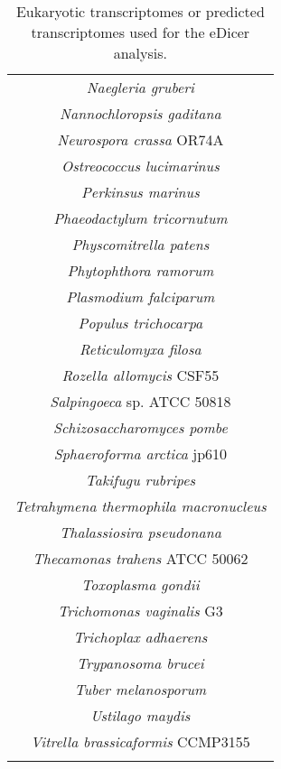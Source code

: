 \begin{center}
\begin{longtable}{|c|}
\textit{Naegleria gruberi}\\
\textit{Nannochloropsis gaditana}\\
\textit{Neurospora crassa} OR74A\\
\textit{Ostreococcus lucimarinus}\\
\textit{Perkinsus marinus}\\
\textit{Phaeodactylum tricornutum}\\
\textit{Physcomitrella patens}\\
\textit{Phytophthora ramorum}\\
\textit{Plasmodium falciparum}\\
\textit{Populus trichocarpa}\\
\textit{Reticulomyxa filosa}\\
\textit{Rozella allomycis} CSF55\\
\textit{Salpingoeca} sp. ATCC 50818\\
\textit{Schizosaccharomyces pombe}\\
\textit{Sphaeroforma arctica} jp610\\
\textit{Takifugu rubripes}\\
\textit{Tetrahymena thermophila macronucleus}\\
\textit{Thalassiosira pseudonana}\\
\textit{Thecamonas trahens} ATCC 50062\\
\textit{Toxoplasma gondii}\\
\textit{Trichomonas vaginalis} G3\\
\textit{Trichoplax adhaerens}\\
\textit{Trypanosoma brucei}\\
\textit{Tuber melanosporum}\\
\textit{Ustilago maydis}\\
\textit{Vitrella brassicaformis} CCMP3155\\
\hline
\caption[Eukaryotes Used for eDicer Anaylsis]{Eukaryotic transcriptomes 
or predicted transcriptomes used for the eDicer analysis.}
\label{tab:edicer_genomes_euks}

\end{longtable}
\end{center}

